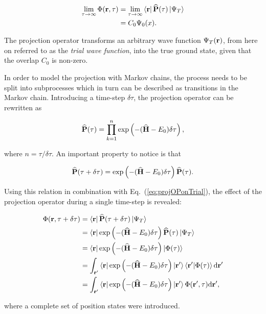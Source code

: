 \begin{align}
 \lim_{\tau\to\infty}\Phi(\mathbf{r}, \tau) &=  \lim_{\tau\to\infty}\left< \mathbf{r} \right|{\bf\widehat{P}}(\tau)\left| \Psi_T \right>\notag \\
                           &= C_0\Psi_0(x). \label{eq:ExactProjection}
\end{align}

The projection operator transforms an arbitrary wave function $\Psi_T(\mathbf{r})$, from here on referred to as the \textit{trial wave function}, into the true ground state, given that the overlap $C_0$ is non-zero.

In order to model the projection with Markov chains, the process needs to be split into subprocesses which in turn can be described as transitions in the Markov chain. Introducing a time-step $\delta\tau$, the projection operator can be rewritten as

\begin{equation}
 {\bf\widehat{P}}(\tau) = \prod_{k=1}^n \exp\left(-({\bf\widehat{H}} - E_0)\delta\tau\right),
\end{equation}

where $n = \tau/\delta\tau$. An important property to notice is that

\begin{equation}
 {\bf\widehat{P}}(\tau + \delta\tau) = \exp\left(-({\bf\widehat{H}} - E_0)\delta\tau\right){\bf\widehat{P}}(\tau).
\end{equation}

Using this relation in combination with Eq.~(\ref{eq:projOPonTrial}), the effect of the projection operator during a single time-step is revealed:

\begin{align}
 \Phi(\mathbf{r}, \tau + \delta\tau) &= \left< \mathbf{r} \right|{\bf\widehat{P}}(\tau + \delta\tau)\left| \Psi_T \right> \notag \\
    &= \left< \mathbf{r} \right| \exp\left(-({\bf\widehat{H}} - E_0)\delta\tau\right){\bf\widehat{P}}(\tau)\left| \Psi_T \right> \notag \\
    &=  \left< \mathbf{r} \right| \exp\left(-({\bf\widehat{H}} - E_0)\delta\tau\right)\left| \Phi(\tau) \right> \notag \\
    &= \int_{\mathbf{r}'}\left< \mathbf{r} \right|\exp\left(-({\bf\widehat{H}} - E_0)\delta\tau\right)\left| \mathbf{r}' \right>\left\langle \mathbf{r}' | \Phi(\tau)\right\rangle\mathrm{d}\mathbf{r}' \notag \\
    &= \int_{\mathbf{r}'}\left< \mathbf{r} \right|\exp\left(-({\bf\widehat{H}} - E_0)\delta\tau\right)\left| \mathbf{r}' \right>\Phi(\mathbf{r}', \tau)\mathrm{d}\mathbf{r}',
\end{align}

where a complete set of position states were introduced.

